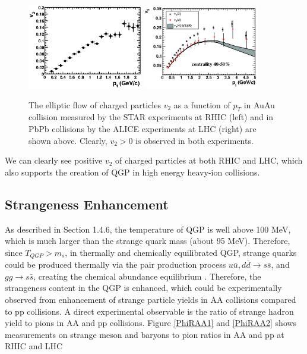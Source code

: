 \begin{figure}[hbtp]
\begin{center}
\includegraphics[width=0.45\textwidth]{Figures/Chapter1/STARV2Plot.eps}
\includegraphics[width=0.45\textwidth]{Figures/Chapter1/ALICEV2Plot.png}
\caption{The elliptic flow of charged particles $v_2$ as a function of $p_T$ in AuAu collision measured by the STAR experiments at RHIC (left) and in PbPb collisions by the ALICE experiments at LHC (right) are shown above. Clearly, $v_2 > 0$ is observed in both experiments.}
\label{V2}
\end{center}
\end{figure}   

We can clearly see positive $v_2$ of charged particles at both RHIC and LHC, which also supports the creation of QGP in high energy heavy-ion collisions.  
 
\subsection{Strangeness Enhancement} 

As described in Section 1.4.6, the temperature of QGP is well above 100 MeV, which is much larger than the strange quark mass (about 95 MeV). Therefore, since $T_{QGP} > m_s$, in thermally and chemically equilibrated QGP, strange quarks could be produced thermally via the pair production process $u \bar u, d \bar d \rightarrow s\bar s$, and $gg \rightarrow s \bar s$, creating the chemical abundance equilibrium \cite{SSEnhance}. Therefore, the strangeness content in the QGP is enhanced, which could be experimentally observed from enhancement of strange particle yields in AA collisions compared to pp collisions. A direct experimental observable is the ratio of strange hadron yield to pions in AA and pp collisions. Figure \ref{PhiRAA1} and \ref{PhiRAA2} shows measurements on strange meson and baryons to pion ratios in AA and pp at RHIC and LHC 

